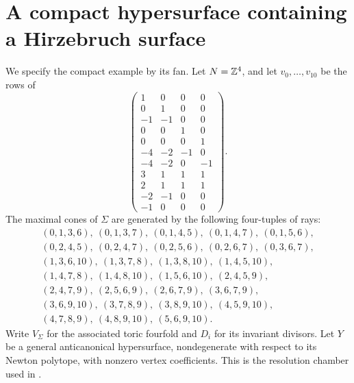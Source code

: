 \section{A compact hypersurface containing a Hirzebruch surface}\label{sec:geometry}

We specify the compact example by its fan. Let $N=\mathbb Z^4$, and let
$v_0,\ldots,v_{10}$ be the rows of
\begin{equation}\label{eq:rays}
 \begin{pmatrix}
 1&0&0&0\\0&1&0&0\\-1&-1&0&0\\0&0&1&0\\0&0&0&1\\
 -4&-2&-1&0\\-4&-2&0&-1\\3&1&1&1\\2&1&1&1\\
 -2&-1&0&0\\-1&0&0&0
 \end{pmatrix}.
\end{equation}
The maximal cones of $\Sigma$ are generated by the following
four-tuples of rays:
\begin{equation}\label{eq:cones}
\begin{gathered}
 (0,1,3,6),\ (0,1,3,7),\ (0,1,4,5),\ (0,1,4,7),\ (0,1,5,6),\\
 (0,2,4,5),\ (0,2,4,7),\ (0,2,5,6),\ (0,2,6,7),\ (0,3,6,7),\\
 (1,3,6,10),\ (1,3,7,8),\ (1,3,8,10),\ (1,4,5,10),\\
 (1,4,7,8),\ (1,4,8,10),\ (1,5,6,10),\ (2,4,5,9),\\
 (2,4,7,9),\ (2,5,6,9),\ (2,6,7,9),\ (3,6,7,9),\\
 (3,6,9,10),\ (3,7,8,9),\ (3,8,9,10),\ (4,5,9,10),\\
 (4,7,8,9),\ (4,8,9,10),\ (5,6,9,10).
\end{gathered}
\end{equation}
Write $V_\Sigma$ for the associated toric fourfold and $D_i$ for
its invariant divisors. Let $Y$ be a general anticanonical
hypersurface, nondegenerate with respect to its Newton polytope,
with nonzero vertex coefficients. This is the resolution chamber used in \cite[Section~4]{WueCounter}.

